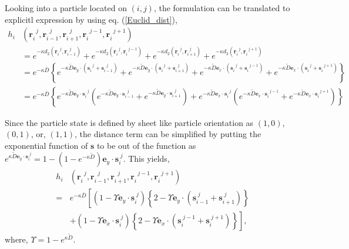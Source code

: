 \documentclass{article}
\begin{document}
Looking into a particle located on $(i, j)$, the formulation can be translated to explicitl expression by using 
eq. (\ref{Euclid_dist}),
\begin{equation}
 \begin{aligned}
 h_i & (\bm{r}_{i}^{\mspace{10mu}j}, \bm{r}_{i-1}^{\mspace{10mu}j}, \bm{r}_{i+1}^{\mspace{10mu}j}, \bm{r}_{i}^{\mspace{10mu}j-1}, \bm{r}_{i}^{\mspace{10mu}j+1})\\
  & = e^{-\kappa d_2 (\bm{r}_{i}^{\mspace{10mu}j}, \bm{r}_{i-1}^{\mspace{10mu}j})} 
   + e^{-\kappa d_2 (\bm{r}_{i}^{\mspace{10mu}j}, \bm{r}_{i}^{\mspace{10mu}j-1})} 
   + e^{-\kappa d_2 (\bm{r}_{i}^{\mspace{10mu}j}, \bm{r}_{i+1}^{\mspace{10mu}j})} 
   + e^{-\kappa d_2 (\bm{r}_{i}^{\mspace{10mu}j}, \bm{r}_{i}^{\mspace{10mu}j+1})}  \\
  & = 
  e^{-\kappa \bar{D}}\left\{
  e^{-\kappa \tilde{D}\bm{e}_y\cdot(\bm{s}_{i}^{\mspace{10mu}j} + \bm{s}_{i-1}^{\mspace{10mu}j})}
  + e^{-\kappa \tilde{D}\bm{e}_y\cdot(\bm{s}_{i}^{\mspace{10mu}j} + \bm{s}_{i+1}^{\mspace{10mu}j})}
  + e^{-\kappa \tilde{D}\bm{e}_x\cdot(\bm{s}_{i}^{\mspace{10mu}j} + \bm{s}_{i}^{\mspace{10mu}j-1})}
  + e^{-\kappa \tilde{D}\bm{e}_x\cdot(\bm{s}_{i}^{\mspace{10mu}j} + \bm{s}_{i}^{\mspace{10mu}j+1})}\right\} \\
  & = 
  e^{-\kappa \bar{D}}\left\{
  e^{-\kappa \tilde{D}\bm{e}_y\cdot\bm{s}_{i}^{\mspace{10mu}j}}
  \left(
  e^{-\kappa \tilde{D}\bm{e}_y\cdot\bm{s}_{i-1}^{\mspace{10mu}j}}
  + e^{-\kappa \tilde{D}\bm{e}_y\cdot\bm{s}_{i+1}^{\mspace{10mu}j}}
  \right)
  + e^{-\kappa \tilde{D}\bm{e}_x\cdot\bm{s}_{i}^{\mspace{10mu}j}}
  \left(
  e^{-\kappa \tilde{D}\bm{e}_x\cdot\bm{s}_{i}^{\mspace{10mu}j-1}}
  + e^{-\kappa \tilde{D}\bm{e}_x\cdot\bm{s}_{i}^{\mspace{10mu}j+1}}
  \right)
  \right\}  \label{part_H}
 \end{aligned}
\end{equation}

Since the particle state is defined by sheet like particle orientation as $(1, 0)$, $(0, 1)$, or, $(1, 1)$, 
the distance term can be simplified by putting the exponential function of $\bm{s}$ to be out of the function as 
$e^{\kappa\tilde{D}\bm{e}_y\cdot\bm{s}_i^{\mspace{5mu}j}} = 1-(1-e^{-\kappa\tilde{D}})\bm{e}_y\cdot\bm{s}_i^{\mspace{5mu}j}$.
This yields,
\begin{equation}
\begin{aligned}
 h_i & (\bm{r}_{i}^{\mspace{10mu}j}, \bm{r}_{i-1}^{\mspace{10mu}j}, \bm{r}_{i+1}^{\mspace{10mu}j}, \bm{r}_{i}^{\mspace{10mu}j-1}, \bm{r}_{i}^{\mspace{10mu}j+1})\\
 = & e^{-\kappa\bar{D}}
  \left[
   (1 - \Upsilon\bm{e}_y\cdot\bm{s}_i^{\mspace{5mu}j})
   \left\{2 - \Upsilon\bm{e}_y\cdot(\bm{s}_{i-1}^{\mspace{5mu}j} + \bm{s}_{i+1}^{\mspace{5mu}j})\right\}\right. \\
   & \left.+ (1 - \Upsilon\bm{e}_x\cdot\bm{s}_i^{\mspace{5mu}j})
   \left\{2 - \Upsilon\bm{e}_x\cdot(\bm{s}_{i}^{\mspace{5mu}j-1} + \bm{s}_{i}^{\mspace{5mu}j+1})\right\}
  \right],
\end{aligned}
\end{equation}
where, $\Upsilon = 1-e^{\kappa\tilde{D}}$.
\end{document}
